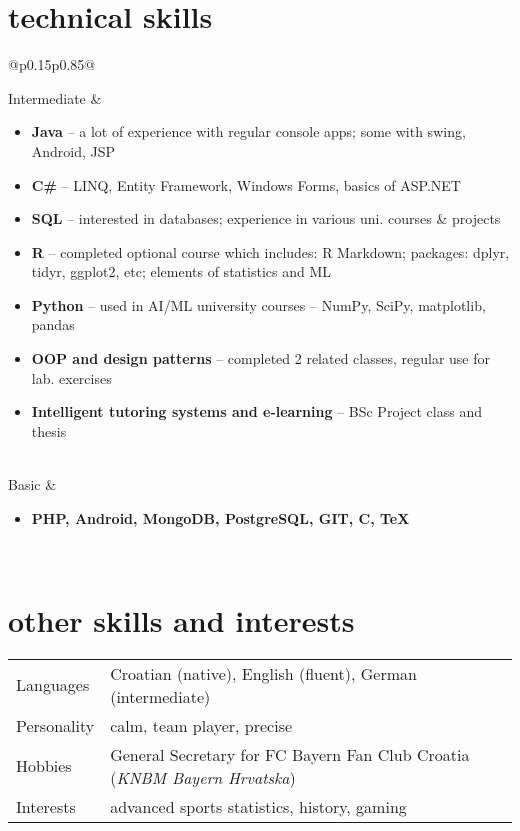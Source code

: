 \documentclass[a4paper]{article}
\makeatletter
\newlength{\tablewidth}
\newenvironment{skills}{%
\setlength{\tablewidth}{\linewidth}
\addtolength{\tablewidth}{-2\tabcolsep}
\begin{tabular}{@{}p{0.15\tablewidth}p{0.85\tablewidth}@{}}
}{%
\end{tabular}
}
\makeatother
\begin{document}
\section{technical skills}
\begin{skills}
    Intermediate &
    \begin{itemize}
        \item \textbf{Java} -- a lot of experience with regular console apps; some with swing, Android, JSP
        \item \textbf{C\#} -- LINQ, Entity Framework, Windows Forms, basics of ASP.NET
        \item \textbf{SQL} -- interested in databases; experience in various uni. courses \& projects
        \item \textbf{R} -- completed optional course which includes:
        \newline
        R Markdown; packages: dplyr, tidyr, ggplot2, etc; elements of statistics and ML
        \item \textbf{Python} -- used in AI/ML university courses -- NumPy, SciPy, matplotlib, pandas
        \item \textbf{OOP and design patterns} -- completed 2 related classes, regular use for lab. exercises
        \item \textbf{Intelligent tutoring systems and e-learning} -- BSc Project class and thesis
    \end{itemize}\\
    Basic &
    \begin{itemize}
        \item \textbf{PHP, Android, MongoDB, PostgreSQL, GIT, C, TeX}
    \end{itemize} \\
\end{skills}


\section{other skills and interests}
\begin{skills}
	Languages & Croatian (native), English (fluent), German (intermediate) \\
	Personality & calm, team player, precise \\
	Hobbies & General Secretary for  FC Bayern Fan Club Croatia (\textit{KNBM Bayern Hrvatska})\\
	Interests & advanced sports statistics, history, gaming \\
\end{skills}
\end{document}
